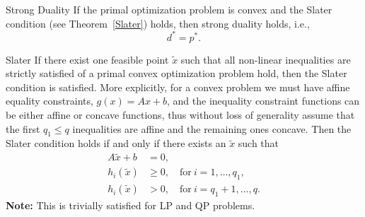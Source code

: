 \begin{theo}{Strong Duality}
    If the primal optimization problem is convex and the Slater condition (see Theorem~\ref{Slater}) holds, then strong duality holds, i\@.e\@.,
    \begin{equation*}
        d^* = p^*.
    \end{equation*}
    \vspace*{-0.5cm}
\end{theo}

\begin{theo}{Slater}  
    \vspace{-0.1cm}  
    If there exist one feasible point $\tilde{x}$ such that all non-linear inequalities are strictly satisfied of a primal convex optimization problem hold, then the Slater condition is satisfied. More explicitly, for a convex problem we must have affine equality constraints, $g(x) = Ax + b$, and the inequality constraint functions can be either affine or concave functions, thus without loss of generality assume that the first $q_1 \leq q$ inequalities are affine and the remaining ones concave. Then the Slater condition holds if and only if there exists an $\tilde{x}$ such that
    \begin{align*}
        A\tilde{x} + b &= 0, \\
        h_i(\tilde{x}) &\geq 0, \quad \text{for} \ i = 1, \ldots, q_1, \\
        h_i(\tilde{x}) &> 0, \quad \text{for} \ i = q_1 + 1, \ldots, q. 
    \end{align*}
    \textbf{Note:} This is trivially satisfied for LP and QP problems.
\end{theo}


